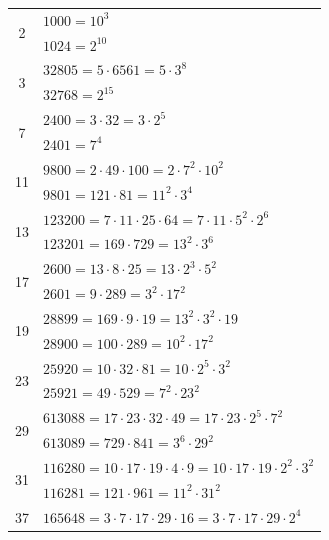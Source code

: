 \documentclass[11pt,letterpaper]{book}
\begin{document}
\begin{longtable}{ c l }
\multirow{2}[2]{*}{\Huge 2}  & $1000 = 10^{3}$ \\
                          & $1024 = 2^{10}$ \\ [1.0em]
\multirow{2}[2]{*}{\Huge 3}  & $32805 = 5\cdot 6561 = 5\cdot 3^{8}$ \\
                          & $32768 = 2^{15}$ \\ [1.0em]
\multirow{2}[2]{*}{\Huge 7}  & $2400 = 3\cdot 32 = 3\cdot 2^{5}$ \\
                          & $2401 = 7^{4}$ \\ [1.0em]
\multirow{2}[2]{*}{\Huge 11} & $9800 = 2\cdot 49\cdot 100 = 2\cdot 7^{2}\cdot 10^{2}$ \\
                          & $9801 = 121\cdot 81 = 11^{2}\cdot 3^{4}$ \\ [1.0em]
\multirow{2}[2]{*}{\Huge 13} & $123200 = 7\cdot 11\cdot 25\cdot 64 = 7\cdot 11\cdot 5^{2}\cdot 2^{6}$ \\
                          & $123201 = 169\cdot 729 = 13^{2}\cdot 3^{6}$ \\ [1.0em]
\multirow{2}[2]{*}{\Huge 17} & $2600 = 13\cdot 8\cdot 25 = 13\cdot 2^{3}\cdot 5^{2}$ \\
                          & $2601 = 9\cdot 289 = 3^{2}\cdot 17^{2}$ \\ [1.0em]
\multirow{2}[2]{*}{\Huge 19} & $28899 = 169\cdot 9\cdot 19 = 13^{2}\cdot 3^{2}\cdot 19$ \\
                          & $28900 = 100\cdot 289 = 10^{2}\cdot 17^{2}$ \\ [1.0em]
\multirow{2}[2]{*}{\Huge 23} & $25920 = 10\cdot 32\cdot 81 = 10\cdot 2^{5}\cdot 3^{2}$ \\
                          & $25921 = 49\cdot 529 = 7^{2}\cdot 23^{2}$ \\ [1.0em]
\multirow{2}[2]{*}{\Huge 29} & $613088 = 17\cdot 23\cdot 32\cdot 49 = 17\cdot 23\cdot 2^{5}\cdot 7^{2}$ \\
                          & $613089 = 729\cdot 841 = 3^{6}\cdot 29^{2}$ \\ [1.0em]
\multirow{2}[2]{*}{\Huge 31} & $116280 = 10\cdot 17\cdot 19\cdot 4\cdot 9 = 10\cdot 17\cdot 19\cdot 2^{2}\cdot 3^{2}$ \\
                          & $116281 = 121\cdot 961 = 11^{2}\cdot 31^{2}$ \\ [1.0em]
\multirow{2}[2]{*}{\Huge 37} & $165648 = 3\cdot 7\cdot 17\cdot 29\cdot 16 = 3\cdot 7\cdot 17\cdot 29\cdot 2^{4}$ \\

\end{longtable}
\end{document}
